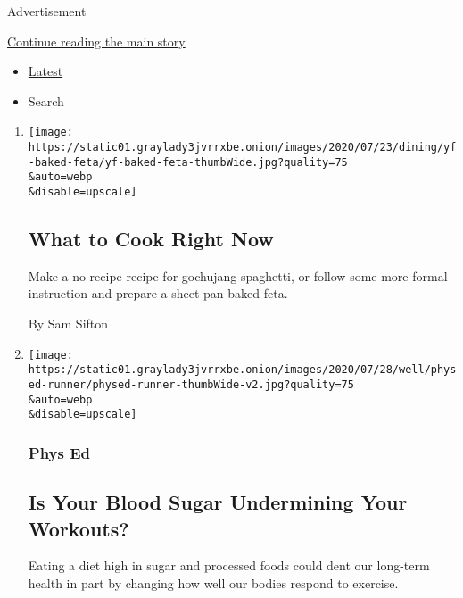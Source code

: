 Advertisement

\protect\hyperlink{after-mid1}{Continue reading the main story}

\begin{itemize}
\tightlist
\item
  \protect\hyperlink{stream-panel}{Latest}
\item
  Search
\end{itemize}

\begin{enumerate}
\def\labelenumi{\arabic{enumi}.}
\item
  \href{/2020/07/29/dining/what-to-cook-right-now.html}{}

  \texttt{[image: https://static01.graylady3jvrrxbe.onion/images/2020/07/23/dining/yf-baked-feta/yf-baked-feta-thumbWide.jpg?quality=75\\\&auto=webp\\\&disable=upscale]}

  \hypertarget{what-to-cook-right-now}{%
  \subsection{What to Cook Right Now}\label{what-to-cook-right-now}}

  Make a no-recipe recipe for gochujang spaghetti, or follow some more
  formal instruction and prepare a sheet-pan baked feta.

  By Sam Sifton
\item
  \href{/2020/07/29/well/move/blood-sugar-diet-foods-workouts-exercise-muscles.html}{}

  \texttt{[image: https://static01.graylady3jvrrxbe.onion/images/2020/07/28/well/physed-runner/physed-runner-thumbWide-v2.jpg?quality=75\\\&auto=webp\\\&disable=upscale]}

  \hypertarget{phys-ed}{%
  \subsubsection{Phys Ed}\label{phys-ed}}

  \hypertarget{is-your-blood-sugar-undermining-your-workouts}{%
  \subsection{Is Your Blood Sugar Undermining Your
  Workouts?}\label{is-your-blood-sugar-undermining-your-workouts}}

  Eating a diet high in sugar and processed foods could dent our
  long-term health in part by changing how well our bodies respond to
  exercise.


\end{enumerate}
